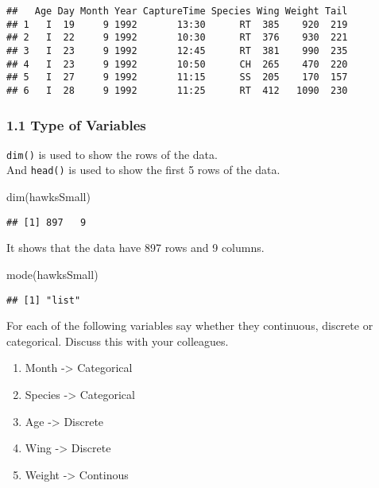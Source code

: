 \documentclass[
]{article}
\newenvironment{Shaded}{\begin{snugshade}}{\end{snugshade}}
\newcommand{\FunctionTok}[1]{\textcolor[rgb]{0.00,0.00,0.00}{#1}}
\newcommand{\NormalTok}[1]{#1}
\providecommand{\tightlist}{%
  \setlength{\itemsep}{0pt}\setlength{\parskip}{0pt}}
\begin{document}
\begin{verbatim}
##   Age Day Month Year CaptureTime Species Wing Weight Tail
## 1   I  19     9 1992       13:30      RT  385    920  219
## 2   I  22     9 1992       10:30      RT  376    930  221
## 3   I  23     9 1992       12:45      RT  381    990  235
## 4   I  23     9 1992       10:50      CH  265    470  220
## 5   I  27     9 1992       11:15      SS  205    170  157
## 6   I  28     9 1992       11:25      RT  412   1090  230
\end{verbatim}

\hypertarget{type-of-variables}{%
\subsubsection{1.1 Type of Variables}\label{type-of-variables}}

\texttt{dim()} is used to show the rows of the data.\\
And \texttt{head()} is used to show the first 5 rows of the data.

\begin{Shaded}
\begin{Highlighting}[]
\FunctionTok{dim}\NormalTok{(hawksSmall)}
\end{Highlighting}
\end{Shaded}

\begin{verbatim}
## [1] 897   9
\end{verbatim}

It shows that the data have 897 rows and 9 columns.

\begin{Shaded}
\begin{Highlighting}[]
\FunctionTok{mode}\NormalTok{(hawksSmall)}
\end{Highlighting}
\end{Shaded}

\begin{verbatim}
## [1] "list"
\end{verbatim}

For each of the following variables say whether they continuous,
discrete or categorical. Discuss this with your colleagues.

\begin{enumerate}
\def\labelenumi{\arabic{enumi}.}
\tightlist
\item
  Month -\textgreater{} Categorical\\
\item
  Species -\textgreater{} Categorical\\
\item
  Age -\textgreater{} Discrete\\
\item
  Wing -\textgreater{} Discrete\\
\item
  Weight -\textgreater{} Continous
\end{enumerate}
\end{document}
